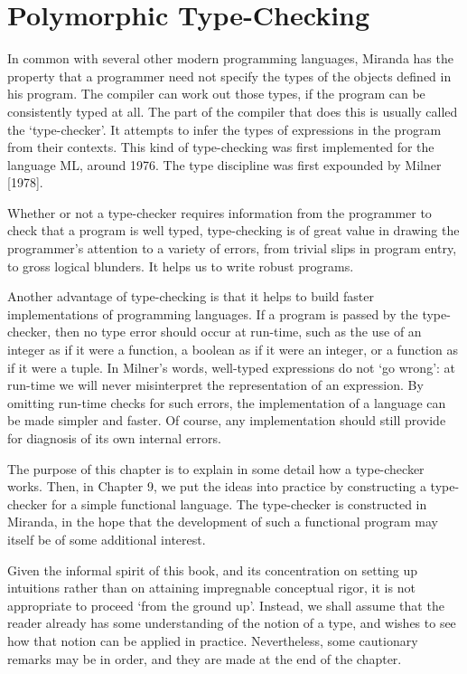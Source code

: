 \chapter{Polymorphic Type-Checking}
\vspace{3cm}

\noindent
In common with several other modern programming languages, Miranda
has the property that a programmer need not specify the types of the objects
defined in his program. The compiler can work out those types, if the program
can be consistently typed at all. The part of the compiler that does this is
usually called the `type-checker'. It attempts to infer the types of expressions
in the program from their contexts. This kind of type-checking was first
implemented for the language ML, around 1976. The type discipline was first
expounded by Milner [1978].

Whether or not a type-checker requires information from the programmer
to check that a program is well typed, type-checking is of great value in
drawing the programmer's attention to a variety of errors, from trivial slips in
program entry, to gross logical blunders. It helps us to write robust programs.

Another advantage of type-checking is that it helps to build faster
implementations of programming languages. If a program is passed by the
type-checker, then no type error should occur at run-time, such as the use of
an integer as if it were a function, a boolean as if it were an integer, or a
function as if it were a tuple. In Milner's words, well-typed expressions do not
`go wrong': at run-time we will never misinterpret the representation of an
expression. By omitting run-time checks for such errors, the implementation
of a language can be made simpler and faster. Of course, any implementation
should still provide for diagnosis of its own internal errors.

The purpose of this chapter is to explain in some detail how a type-checker
works. Then, in Chapter 9, we put the ideas into practice by constructing a
type-checker for a simple functional language. The type-checker is constructed
in Miranda, in the hope that the development of such a functional
program may itself be of some additional interest.

Given the informal spirit of this book, and its concentration on setting up
intuitions rather than on attaining impregnable conceptual rigor, it is not
appropriate to proceed `from the ground up'. Instead, we shall assume that
the reader already has some understanding of the notion of a type, and wishes
to see how that notion can be applied in practice. Nevertheless, some
cautionary remarks may be in order, and they are made at the end of the
chapter.

